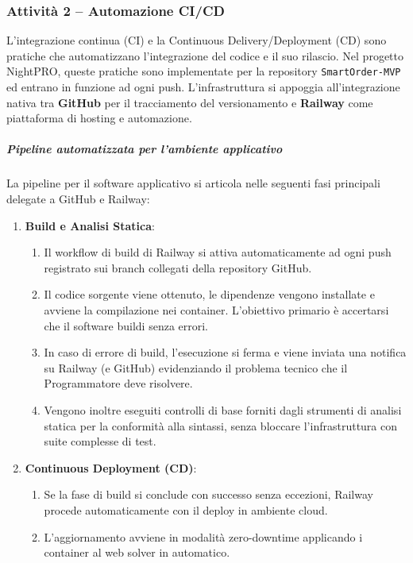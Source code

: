 \documentclass[a4paper, 11pt, oneside]{scrartcl}
\begin{document}
\subsubsection{Attività 2 – Automazione CI/CD}

L'integrazione continua (CI){\scriptsize{}} e la Continuous Delivery/Deployment (CD){\scriptsize{}} sono pratiche che automatizzano l'integrazione del codice e il suo rilascio. Nel progetto NightPRO, queste pratiche sono implementate per la repository \texttt{SmartOrder-MVP} ed entrano in funzione ad ogni push.
L'infrastruttura si appoggia all'integrazione nativa tra \textbf{GitHub} per il tracciamento del versionamento e \textbf{Railway} come piattaforma di hosting e automazione.

\subparagraph{Pipeline automatizzata per l'ambiente applicativo}

La pipeline per il software applicativo si articola nelle seguenti fasi principali delegate a GitHub e Railway:

\begin{enumerate}
    \item \textbf{Build e Analisi Statica}:
    \begin{enumerate}[label=\alph*.]
        \item Il workflow di build di Railway si attiva automaticamente ad ogni push registrato sui branch collegati della repository GitHub.
        \item Il codice sorgente viene ottenuto, le dipendenze vengono installate e avviene la compilazione nei container. L'obiettivo primario è accertarsi che il software buildi senza errori.
        \item In caso di errore di build, l'esecuzione si ferma e viene inviata una notifica su Railway (e GitHub) evidenziando il problema tecnico che il Programmatore deve risolvere.
        \item Vengono inoltre eseguiti controlli di base forniti dagli strumenti di analisi statica per la conformità alla sintassi, senza bloccare l'infrastruttura con suite complesse di test.
    \end{enumerate}
    \item \textbf{Continuous Deployment (CD)}:
    \begin{enumerate}[label=\alph*.]
        \item Se la fase di build si conclude con successo senza eccezioni, Railway procede automaticamente con il deploy in ambiente cloud.
        \item L'aggiornamento avviene in modalità zero-downtime applicando i container al web solver in automatico.
    \end{enumerate}
\end{enumerate}
\end{document}
